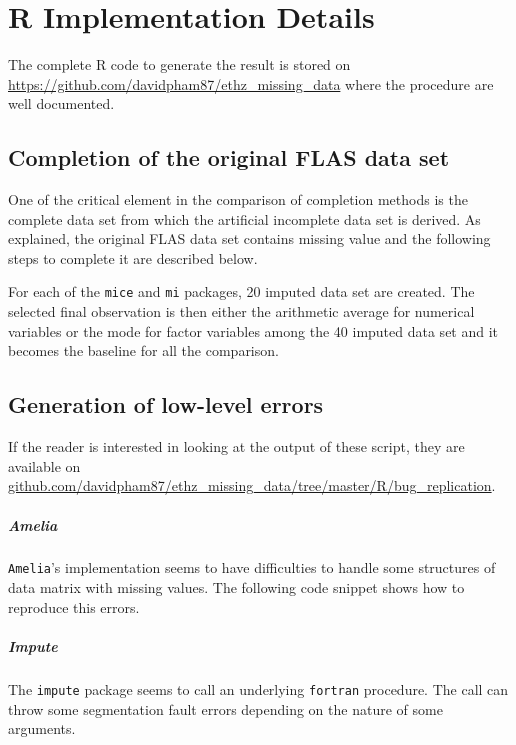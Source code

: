 \chapter{R Implementation Details}
\label{app:complement}

The complete \textsf{R} code to generate the result is stored on
\url{https://github.com/davidpham87/ethz\_missing\_data} where the procedure
are well documented.

\section{Completion of the original FLAS data set}

One of the critical element in the comparison of completion methods is the
complete data set from which the artificial incomplete data set is derived. As
explained, the original FLAS data set contains missing value and the following
steps to complete it are described below.

For each of the \texttt{mice} and \texttt{mi} packages, 20 imputed data set are
created. The selected final observation is then either the arithmetic average
for numerical variables or the mode for factor variables among the 40 imputed
data set and it becomes the baseline for all the comparison.



\section{Generation of low-level errors}

If the reader is interested in looking at the output of these script, they are
available on
\url{github.com/davidpham87/ethz_missing_data/tree/master/R/bug_replication}.

\paragraph{Amelia}

\texttt{Amelia}'s implementation seems to have difficulties to handle some
structures of data matrix with missing values. The following code snippet shows
how to reproduce this errors.



\paragraph{Impute}

The \texttt{impute} package seems to call an underlying \texttt{fortran}
procedure. The call can throw some segmentation fault errors depending on
the nature of some arguments.



